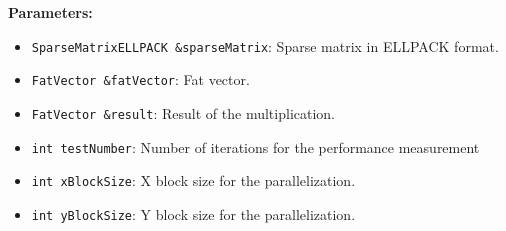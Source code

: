 \documentclass[12pt,oneside]{book} %
\begin{document}
\begin{subappendices}
    \textbf{Parameters:}
    \begin{itemize}
        \item \texttt{SparseMatrixELLPACK \&sparseMatrix}: Sparse matrix in ELLPACK format.
        \item \texttt{FatVector \&fatVector}: Fat vector.
        \item \texttt{FatVector \&result}: Result of the multiplication.
        \item \texttt{int testNumber}: Number of iterations for the performance measurement
        \item \texttt{int xBlockSize}: X block size for the parallelization.
        \item \texttt{int yBlockSize}: Y block size for the parallelization.
    \end{itemize}

\end{subappendices}
\end{document}
